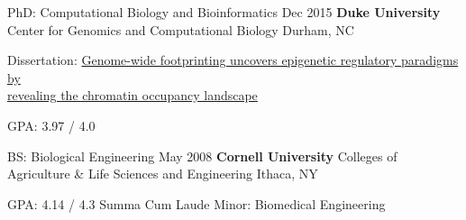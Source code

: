 
\begin{resentries}

  \resentry
	{PhD: Computational Biology and Bioinformatics}
	{Dec 2015}
	{\textbf{Duke University} \xspace \bullet \xspace \xspace Center for Genomics and Computational Biology}
	{Durham, NC}
    {
      \begin{hangitems} %
		\item{Dissertation: \href{https://dukespace.lib.duke.edu/dspace/handle/10161/11371}{\color{blue} Genome-wide footprinting uncovers epigenetic regulatory paradigms by\\ revealing the chromatin occupancy landscape}}
		\item{GPA: 3.97 / 4.0}
      \end{hangitems}
    }

  \resentry
	{BS: Biological Engineering}
	{May 2008}
	{\textbf{Cornell University} \xspace \bullet \xspace \xspace Colleges of Agriculture \& Life Sciences and Engineering}
	{Ithaca, NY}
    {
      \begin{cvitems} %
		\item {GPA: 4.14 / 4.3 \xspace \bullet \xspace \xspace Summa Cum Laude \xspace \bullet \xspace \xspace Minor: Biomedical Engineering}
      \end{cvitems}
    }
\end{resentries}
\vspace{-1mm}
